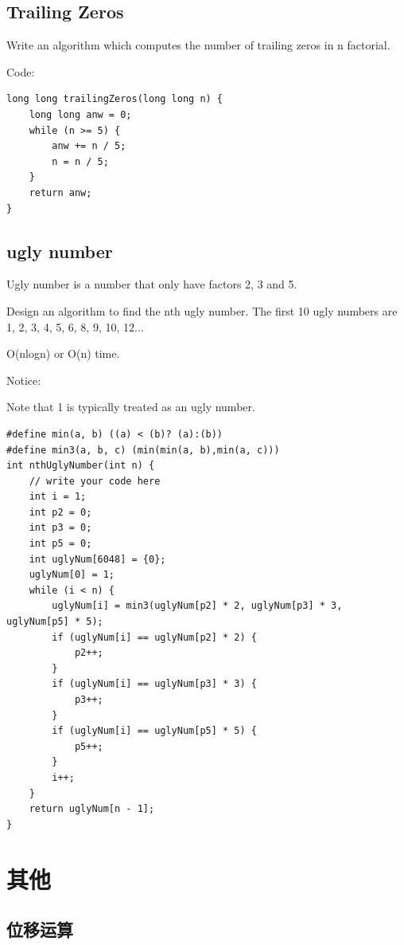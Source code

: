 \documentclass[12pt]{article}  %
\begin{document}
\subsection{Trailing Zeros}

Write an algorithm which computes the number of trailing zeros in n factorial.

Code:
{\setmainfont{Menlo}
\begin{lstlisting}
long long trailingZeros(long long n) {
    long long anw = 0;
    while (n >= 5) {
        anw += n / 5;
        n = n / 5;
    }
    return anw;
}
\end{lstlisting}}

\subsection{ugly number \uppercase\expandafter{}}

Ugly number is a number that only have factors 2, 3 and 5.

Design an algorithm to find the nth ugly number. The first 10 ugly numbers are 1, 2, 3, 4, 5, 6, 8, 9, 10, 12...

O(nlogn) or O(n) time.

Notice:

Note that 1 is typically treated as an ugly number.

{\setmainfont{Menlo}
\begin{lstlisting}
#define min(a, b) ((a) < (b)? (a):(b))
#define min3(a, b, c) (min(min(a, b),min(a, c)))
int nthUglyNumber(int n) {
    // write your code here
    int i = 1;
    int p2 = 0;
    int p3 = 0;
    int p5 = 0;
    int uglyNum[6048] = {0};
    uglyNum[0] = 1;
    while (i < n) {
        uglyNum[i] = min3(uglyNum[p2] * 2, uglyNum[p3] * 3, uglyNum[p5] * 5);
        if (uglyNum[i] == uglyNum[p2] * 2) {
            p2++;
        }
        if (uglyNum[i] == uglyNum[p3] * 3) {
            p3++;
        }
        if (uglyNum[i] == uglyNum[p5] * 5) {
            p5++;
        }
        i++;
    }
    return uglyNum[n - 1];
}
\end{lstlisting}}

\section{其他}

\subsection{位移运算}
\end{document}
